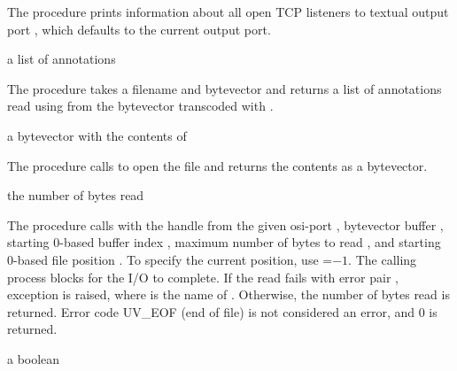 The  procedure prints information about all
open TCP listeners to textual output port
, which defaults to the current output port.

\begin{procedure}
\end{procedure}
\returns{} a list of annotations

The  procedure takes a filename  and
 bytevector and returns a list of annotations read using
 from the  bytevector
transcoded with .

\begin{procedure}
\end{procedure}
\returns{} a bytevector with the contents of 

The  procedure calls  to open the file  and returns the contents
as a bytevector.

\begin{procedure}
\end{procedure}
\returns{} the number of bytes read

The  procedure calls  with
the handle from the given osi-port , bytevector buffer
, starting 0-based buffer index , maximum number of
bytes to read , and starting 0-based file position . To
specify the current position, use =$-1$. The calling process
blocks for the I/O to complete. If the read fails with error pair
, exception  is raised, where  is
the name of . Otherwise, the number of bytes read is
returned. Error code UV\_EOF (end of file) is not considered an error,
and 0 is returned.

\begin{procedure}
\end{procedure}
\returns{} a boolean

